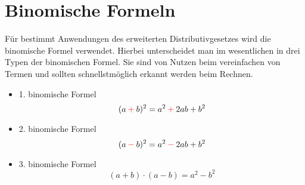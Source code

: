 \section{Binomische Formeln}
Für bestimmt Anwendungen des erweiterten Distributivgesetzes wird die binomische Formel verwendet. Hierbei unterscheidet man im wesentlichen in drei Typen der binomischen Formel. Sie sind von Nutzen beim vereinfachen von Termen und sollten schnellstmöglich erkannt werden beim Rechnen. 
\begin{itemize}
	\item 1. binomische Formel \[(a\color{red}+\color{black}b)^2=a^2\color{red}+\color{black}2ab+b^2\]
	\item 2. binomische Formel \[(a\color{red}-\color{black}b)^2=a^2\color{red}-\color{black}2ab+b^2\]
	\item 3. binomische Formel \[(a+b)\cdot (a-b)=a^2-b^2\]
\end{itemize}
